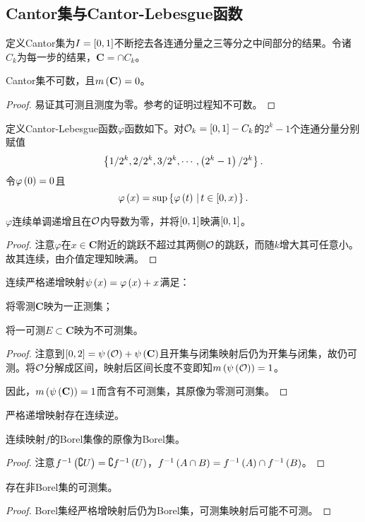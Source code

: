 \documentclass{ctexrep}
\begin{document}
  \subsection{Cantor集与Cantor-Lebesgue函数}
  \begin{definition}
    定义Cantor集为$I=\left[0,1\right]$不断挖去各连通分量之三等分之中间部分的结果。令诸$C_k$为每一步的结果，$\mathbf{C}=\cap C_k$。
  \end{definition}
  \begin{theorem}
    Cantor集不可数，且$m\left(\mathbf{C}\right)=0$。
  \end{theorem}
  \begin{proof}
    易证其可测且测度为零。参考的证明过程知不可数。
  \end{proof}
  定义Cantor-Lebesgue函数$\varphi$函数如下。对$\mathcal{O}_k=\left[0,1\right]-C_k$的$2^k-1$个连通分量分别赋值
  \[ \left\{1/2^k,2/2^k,3/2^k,\cdots,\left(2^k-1\right)/2^k\right\}. \]
  令$\varphi\left(0\right)=0$且
  \[ \varphi\left(x\right) = \sup\left\{\varphi\left(t\right) \, \left| \, t\in\left[0,x\right) \right.\right\}. \]
  \begin{theorem}
    $\varphi$连续单调递增且在$\mathcal{O}$内导数为零，并将$\left[0,1\right]$映满$\left[0,1\right]$。
  \end{theorem}
  \begin{proof}
    注意$\varphi$在$x\in\mathbf{C}$附近的跳跃不超过其两侧$\mathcal{O}$的跳跃，而随$k$增大其可任意小。故其连续，由介值定理知映满。
  \end{proof}
  \begin{theorem}
    \label{thm:cantorl}
    连续严格递增映射$\psi\left(x\right)=\varphi\left(x\right)+x$满足：
    \begin{aenum}
      \item 将零测$\mathbf{C}$映为一正测集；
      \item 将一可测$E\subset\mathbf{C}$映为不可测集。
    \end{aenum}
  \end{theorem}
  \begin{proof}
    注意到$\left[0,2\right]=\psi\left(\mathcal{O}\right)+\psi\left(\mathbf{C}\right)$且开集与闭集映射后仍为开集与闭集，故仍可测。将$\mathcal{O}$分解成区间，映射后区间长度不变即知$m\left(\psi\left(\mathcal{O}\right)\right)=1$。
    \par
    因此，$m\left(\psi\left(\mathbf{C}\right)\right)=1$而含有不可测集，其原像为零测可测集。
  \end{proof}
  \begin{lemma}
    严格递增映射存在连续逆。
  \end{lemma}
  \begin{lemma}
    连续映射$f$的Borel集像的原像为Borel集。
  \end{lemma}
  \begin{proof}
    注意$f^{-1}\left(\complement U\right)=\complement f^{-1}\left(U\right)$，$f^{-1}\left(A\cap B\right)=f^{-1}\left(A\right) \cap f^{-1}\left(B\right)$。
  \end{proof}
  \begin{theorem}
    存在非Borel集的可测集。
  \end{theorem}
  \begin{proof}
    Borel集经严格增映射后仍为Borel集，可测集映射后可能不可测。
  \end{proof}
\end{document}
